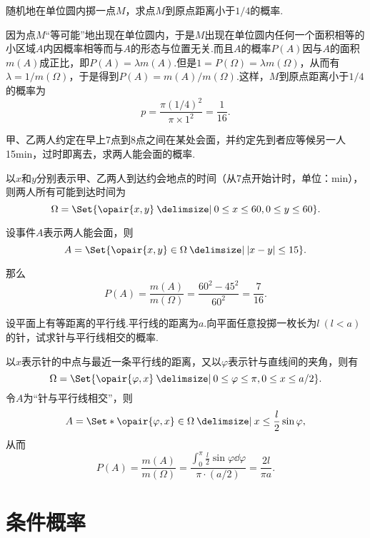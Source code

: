\begin{example}
随机地在单位圆内掷一点\(M\)，求点\(M\)到原点距离小于\(1/4\)的概率.
\begin{solution}
因为点\(M\)“等可能”地出现在单位圆内，于是\(M\)出现在单位圆内任何一个面积相等的小区域\(A\)内因概率相等而与\(A\)的形态与位置无关.而且\(A\)的概率\(P(A)\)因与\(A\)的面积\(m(A)\)成正比，即\(P(A)=\lambda m(A)\).但是\(1 = P(\Omega) = \lambda m(\Omega)\)，从而有\(\lambda = 1/m(\Omega)\)，于是得到\(P(A) = m(A)/m(\Omega)\).这样，\(M\)到原点距离小于\(1/4\)的概率为\[
p = \frac{\pi (1/4)^2}{\pi \times 1^2} = \frac{1}{16}.
\]
\end{solution}
\end{example}

\begin{example}[会面问题]
甲、乙两人约定在早上7点到8点之间在某处会面，并约定先到者应等候另一人15min，过时即离去，求两人能会面的概率.
\begin{solution}
以\(x\)和\(y\)分别表示甲、乙两人到达约会地点的时间（从7点开始计时，单位：min），则两人所有可能到达时间为\[
\Omega = \Set{ \opair{x,y} \given 0 \leq x \leq 60, 0 \leq y \leq 60 }.
\]

设事件\(A\)表示两人能会面，则\[
A = \Set{ \opair{x,y}\in\Omega \given \abs{x-y} \leq 15 }.
\]

那么\[
P(A) = \frac{m(A)}{m(\Omega)} = \frac{60^2 - 45^2}{60^2} = \frac{7}{16}.
\]
\end{solution}
\end{example}

\begin{example}[布冯投针问题]
设平面上有等距离的平行线.平行线的距离为\(a\).向平面任意投掷一枚长为\(l\ (l<a)\)的针，试求针与平行线相交的概率.
\begin{solution}
以\(x\)表示针的中点与最近一条平行线的距离，又以\(\varphi\)表示针与直线间的夹角，则有\[
\Omega = \Set{ \opair{\varphi,x} \given 0 \leq \varphi \leq \pi, 0 \leq x \leq a/2 }.
\]令\(A\)为“针与平行线相交”，则\[
A = \Set*{ \opair{\varphi,x}\in\Omega \given x \leq \frac{l}{2} \sin\varphi },
\]从而\[
P(A) = \frac{m(A)}{m(\Omega)} = \frac{\int_0^{\pi}\frac{l}{2} \sin\varphi \dd{\varphi}}{\pi \cdot (a/2)} = \frac{2l}{\pi a}.
\]
\end{solution}
\end{example}

\section{条件概率}

